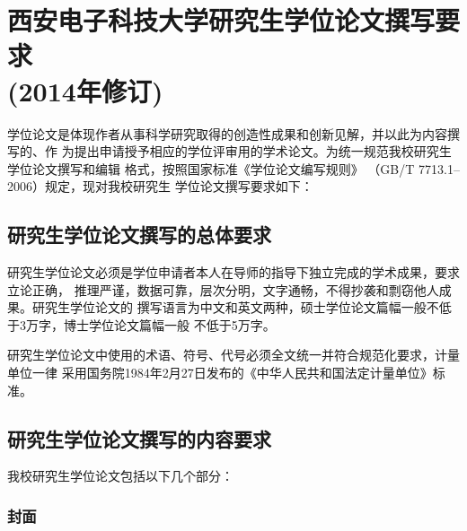 

\chapter[2014年版研究生学位论文撰写要求]{西安电子科技大学研究生学位论文撰写要
  求\\(2014年修订)}
\label{cha:guidance-graduates}

学位论文是体现作者从事科学研究取得的创造性成果和创新见解，并以此为内容撰写的、作
为提出申请授予相应的学位评审用的学术论文。为统一规范我校研究生学位论文撰写和编辑
格式，按照国家标准《学位论文编写规则》 （GB/T 7713.1--2006）规定，现对我校研究生
学位论文撰写要求如下：

\section{研究生学位论文撰写的总体要求}

研究生学位论文必须是学位申请者本人在导师的指导下独立完成的学术成果，要求立论正确，
推理严谨，数据可靠，层次分明，文字通畅，不得抄袭和剽窃他人成果。研究生学位论文的
撰写语言为中文和英文两种，硕士学位论文篇幅一般不低于3万字，博士学位论文篇幅一般
不低于5万字。

研究生学位论文中使用的术语、符号、代号必须全文统一并符合规范化要求，计量单位一律
采用国务院1984年2月27日发布的《中华人民共和国法定计量单位》标准。

\section{研究生学位论文撰写的内容要求}

我校研究生学位论文包括以下几个部分：

\subsection{封面}

